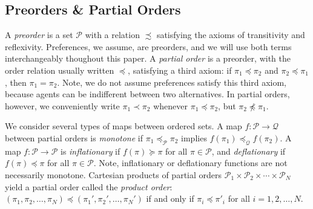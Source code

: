 \documentclass[conference]{ieeeconf}
\renewcommand{\preceq}{\preccurlyeq}
\renewcommand{\succeq}{\succcurlyeq}
\renewcommand{\P}{\mathcal{P}}
\newcommand{\Q}{\mathcal{Q}}
\renewcommand{\L}{\mathcal{L}}
\DeclareMathOperator{\Fix}{Fix}
\DeclareMathOperator{\Pre}{Prefix}
\DeclareMathOperator{\Post}{Suffix}
\DeclareMathOperator{\lfp}{lfp}
\DeclareMathOperator{\gfp}{gfp}
\newtheorem{lemma}{Lemma}
\begin{document}
\vspace{-0.25em}
\subsection{Preorders \& Partial Orders}
\vspace{-0.25em}

A \emph{preorder} is a set $\P$ with a relation $\precsim$ satisfying the axioms of transitivity and reflexivity. Preferences, we assume, are preorders, and we will use both terms interchangeably thoughout this paper. A \emph{partial order} is a preorder, with the order relation usually written $\preceq$, satisfying a third axiom: if $\pi_1 \preceq \pi_2$ and $\pi_2 \preceq \pi_1$, then $\pi_1 = \pi_2$. Note, we do not assume preferences satisfy this third axiom, because agents can be indifferent between two alternatives. In partial orders, however, we conveniently write $\pi_1 \prec \pi_2$ whenever $\pi_1 \preceq \pi_2$, but $\pi_2 \not \preceq \pi_1$.

We consider several types of maps between ordered sets. A map $f: \P \to \Q$ between partial orders is \emph{monotone} if $\pi_1 \preceq_{\P} \pi_2$ implies $f(\pi_1) \preceq_{\Q} f(\pi_2)$. A map $f: \P \to \P$ is \emph{inflationary} if $f(\pi) \succeq \pi$ for all $\pi \in \P$, and \emph{deflationary} if $f(\pi) \preceq \pi$ for all $\pi \in \P$. Note, inflationary or deflationary functions are not necessarily monotone.
Cartesian products of partial orders $\P_1 \times \P_2 \times \cdots \times \P_N$ yield a partial order called the \emph{product order}: $(\pi_1, \pi_2, \dots, \pi_N) \preceq (\pi_1', \pi_2', \dots, \pi_N')$ if and only if $\pi_i \preceq \pi'_i$ for all $i = 1,2,\dots, N$. 

\end{document}
